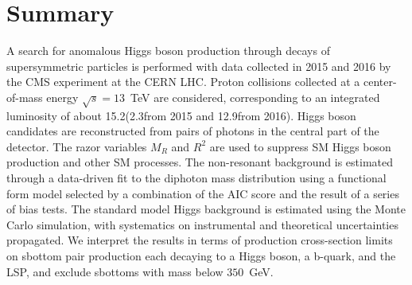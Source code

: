 \section{Summary}

A search for anomalous Higgs boson production through decays of supersymmetric particles is performed with
data collected in 2015 and 2016 by the CMS experiment at the CERN LHC. Proton collisions collected at a center-of-mass energy 
$\sqrt{s}=13$~TeV are considered, corresponding to an integrated luminosity of about 
15.2\fbinv (2.3\fbinv from 2015 and 12.9\fbinv from 2016). Higgs boson candidates are reconstructed from 
pairs of photons in the central part of the detector. The razor variables $M_{R}$ and $R^{2}$ are used to 
suppress SM Higgs boson production and other SM processes. The non-resonant background is estimated through a 
data-driven fit to the diphoton mass distribution using a functional form model selected
by a combination of the AIC score and the result of a series of bias tests. The standard model Higgs background
is estimated using the Monte Carlo simulation, with systematics on instrumental and theoretical uncertainties
propagated. We interpret the results in terms of production cross-section limits on sbottom pair production
each decaying to a Higgs boson, a b-quark, and the LSP, and exclude sbottoms with mass below $350$~GeV.

